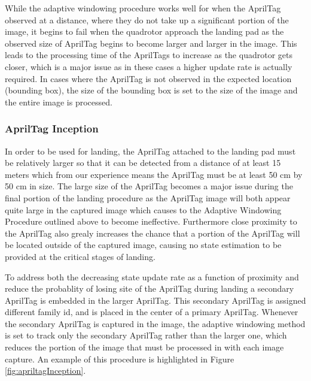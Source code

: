 \documentclass[11pt, twocolumn]{article}
\begin{document}
While the adaptive windowing procedure works well for when the AprilTag observed at a distance, where they do not take up a significant portion of the image, it begins to fail when the quadrotor approach the landing pad as the observed size of AprilTag begins to become larger and larger in the  image. This leads to the processing time of the AprilTags to increase as the quadrotor gets closer, which is a major issue as in these cases a higher update rate is actually required. In cases where the AprilTag is not observed in the expected location (bounding box), the size of the bounding box is set to the size of the image and the entire image is processed. 

\subsubsection{AprilTag Inception}
 In order to be used for landing, the AprilTag attached to the landing pad must be relatively larger so that it can be detected from a distance of at least 15 meters which from our experience means the AprilTag must be at least 50 cm by 50 cm in size. The large size of the AprilTag becomes a major issue during the final portion of the landing procedure as the AprilTag image will both appear quite large in the captured image which causes to the Adaptive Windowing Procedure outlined above to become ineffective. Furthermore close proximity to the AprilTag also grealy increases the chance that a portion of the AprilTag will be located outside of the captured image, causing no state estimation to be provided at the critical stages of landing. 
 
To address both the decreasing state update rate as a function of proximity and reduce the probablity of losing site of the AprilTag during landing a secondary AprilTag is embedded in the larger AprilTag. This secondary AprilTag is assigned different family id, and is placed in the center of a primary AprilTag. Whenever the secondary AprilTag is captured in the image, the adaptive windowing method is set to track only the secondary AprilTag rather than the larger one, which reduces the portion of the image that must be processed in with each image capture. An example of this procedure is highlighted in Figure \ref{fig:apriltagInception}.
\end{document}
